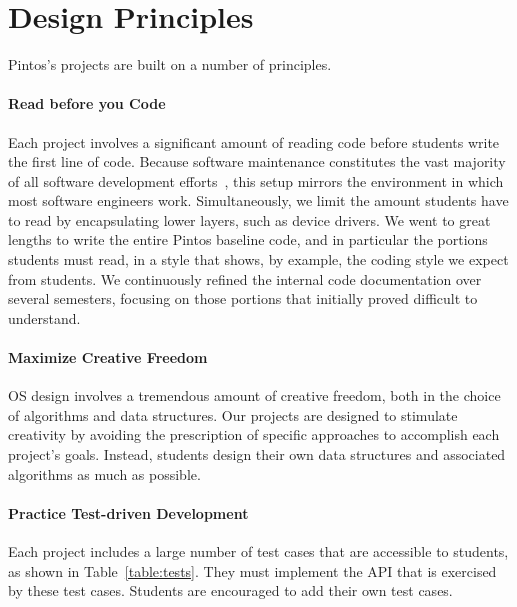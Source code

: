 \section{Design Principles}
\label{sec:designprinciples}

Pintos's projects are built on a number of principles.

\paragraph{Read before you Code}
Each project involves a significant amount of reading code before
students write the first line of code.
Because software maintenance constitutes the vast majority of all
software development efforts~\cite{Boehm1981Software}, this setup mirrors the 
environment in which most software engineers work.
Simultaneously, we limit the amount students have to read
by encapsulating lower layers, such as device drivers.
We went to great lengths to write the entire Pintos baseline code,
and in particular the portions students must read, in a style that shows,
by example, the coding style we expect from students.  
We continuously refined the internal code documentation over several
semesters, focusing on those portions that initially proved difficult to understand. 

\paragraph{Maximize Creative Freedom}
OS design involves a tremendous amount of creative freedom, both in the
choice of algorithms and data structures.  Our projects are designed to
stimulate creativity by avoiding the prescription of specific approaches
to accomplish each project's goals.  Instead, students design their
own data structures and associated algorithms as much as possible.

\paragraph{Practice Test-driven Development}
Each project includes a large number of test cases that are accessible
to students, as shown in Table~\ref{table:tests}.
They must implement the API that is exercised by these test cases.  
Students are encouraged to add their own test cases.

